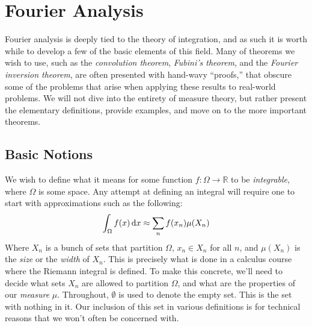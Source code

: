 \section{Fourier Analysis}
    Fourier analysis is deeply tied to the theory of integration, and as such
    it is worth while to develop a few of the basic elements of this field.
    Many of theorems we wish to use, such as the \textit{convolution theorem},
    \textit{Fubini's theorem}, and the \textit{Fourier inversion theorem},
    are often presented with hand-wavy ``proofs,'' that obscure some of the
    problems that arise when applying these results to real-world problems. We
    will not dive into the entirety of measure theory, but rather present the
    elementary definitions, provide examples, and move on to the
    more important theorems.
    \subsection{Basic Notions}
        We wish to define what it means for some function
        $f:\Omega\rightarrow\mathbb{R}$ to be \textit{integrable}, where
        $\Omega$ is some space. Any attempt at defining an integral will
        require one to start with approximations such as the following:
        \begin{equation}
            \int_{\Omega}f(x)\mathop{}\!\mathrm{d}{x}\approx\sum_{n}f(x_{n})\mu(X_{n})
        \end{equation}
        Where $X_{n}$ is a bunch of sets that partition $\Omega$,
        $x_{n}\in{X}_{n}$ for all $n$, and $\mu(X_{n})$ is the \textit{size} or
        the \textit{width} of $X_{n}$. This is precisely what is done in a
        calculus course where the Riemann integral is defined. To make this
        concrete, we'll need to decide what sets $X_{n}$ are allowed to
        partition $\Omega$, and what are the properties of our
        \textit{measure} $\mu$. Throughout, $\emptyset$ is used to denote
        the empty set. This is the set with nothing in it. Our inclusion of
        this set in various definitions is for technical reasons that we won't
        often be concerned with.
